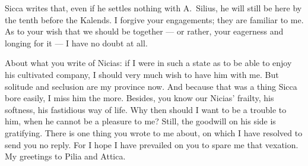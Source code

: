 

 Sicca writes that, even if he settles nothing with A.~Silius, he will still be here by the tenth before the Kalends. I forgive your engagements; they are familiar to me. As to your wish that we should be together --- or rather, your eagerness and longing for it --- I have no doubt at all.

 About what you write of Nicias: if I were in such a state as to be able to enjoy his cultivated company, I should very much wish to have him with me. But solitude and seclusion are my province now. And because that was a thing Sicca bore easily, I miss him the more. Besides, you know our Nicias' frailty, his softness, his fastidious way of life. Why then should I want to be a trouble to him, when he cannot be a pleasure to me? Still, the goodwill on his side is gratifying. There is one thing you wrote to me about, on which I have resolved to send you no reply. For I hope I have prevailed on you to spare me that vexation. My greetings to Pilia and Attica.
